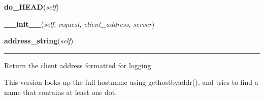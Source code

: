     \label{pydsp:pydspWebServer:do_GET}

    \vspace{0.5ex}

    \begin{boxedminipage}{\textwidth}

    \raggedright \textbf{do\_HEAD}(\textit{self})

    \end{boxedminipage}

    \label{SocketServer:BaseRequestHandler:__init__}

    \vspace{0.5ex}

    \begin{boxedminipage}{\textwidth}

    \raggedright \textbf{\_\_init\_\_}(\textit{self}, \textit{request}, \textit{client\_address}, \textit{server})

    \end{boxedminipage}

    \label{BaseHTTPServer:BaseHTTPRequestHandler:address_string}

    \vspace{0.5ex}

    \begin{boxedminipage}{\textwidth}

    \raggedright \textbf{address\_string}(\textit{self})

    \vspace{-1.5ex}

    \rule{\textwidth}{0.5\fboxrule}
    Return the client address formatted for logging.

    This version looks up the full hostname using gethostbyaddr(), and 
    tries to find a name that contains at least one dot.

    \vspace{1ex}

    \end{boxedminipage}

    \label{BaseHTTPServer:BaseHTTPRequestHandler:date_time_string}

    \vspace{0.5ex}

